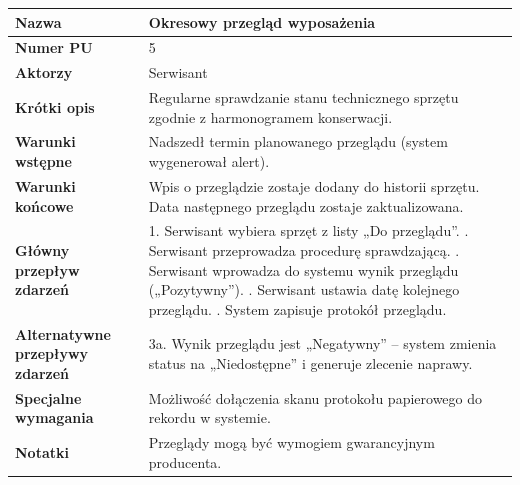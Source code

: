 \documentclass{article}
\begin{document}
    \begin{tabular}{|m{10em}|m{30em}|}
        \hline
        \textbf{Nazwa} & Okresowy przegląd wyposażenia \\
        \hline
        \textbf{Numer PU} & 5 \\
        \hline
        \textbf{Aktorzy} & Serwisant \\
        \hline
        \textbf{Krótki opis} & Regularne sprawdzanie stanu technicznego sprzętu zgodnie z harmonogramem konserwacji. \\
        \hline
        \textbf{Warunki wstępne} & Nadszedł termin planowanego przeglądu (system wygenerował alert). \\
        \hline
        \textbf{Warunki końcowe} & Wpis o przeglądzie zostaje dodany do historii sprzętu. Data następnego przeglądu zostaje zaktualizowana. \\
        \hline
        \textbf{Główny przepływ zdarzeń} & 
            1. Serwisant wybiera sprzęt z listy „Do przeglądu”. \newline
            2. Serwisant przeprowadza procedurę sprawdzającą. \newline
            3. Serwisant wprowadza do systemu wynik przeglądu („Pozytywny”). \newline
            4. Serwisant ustawia datę kolejnego przeglądu. \newline
            5. System zapisuje protokół przeglądu. \\
        \hline
        \textbf{Alternatywne przepływy zdarzeń} & 
            3a. Wynik przeglądu jest „Negatywny” – system zmienia status na „Niedostępne” i generuje zlecenie naprawy. \\
        \hline
        \textbf{Specjalne wymagania} & Możliwość dołączenia skanu protokołu papierowego do rekordu w systemie. \\
        \hline
        \textbf{Notatki} & Przeglądy mogą być wymogiem gwarancyjnym producenta. \\
        \hline
    \end{tabular}

    \vspace{1cm}
\end{document}
